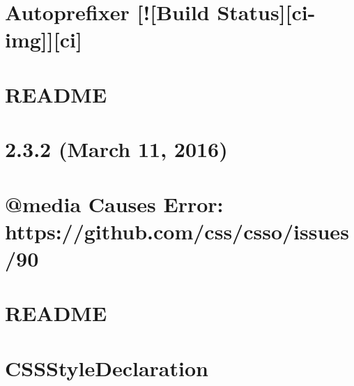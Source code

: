 \documentclass[twoside]{book}
\newcommand{\+}{\discretionary{\mbox{\scriptsize$\hookleftarrow$}}{}{}}
\begin{document}
\chapter{Autoprefixer \mbox{[}!\mbox{[}Build Status\mbox{]}\mbox{[}ci-\/img\mbox{]}\mbox{]}\mbox{[}ci\mbox{]}}
\label{md__c_1_workspace_demo_src_main_script_node_modules_cssnano_node_modules_autoprefixer__r_e_a_d_m_e}

\chapter{R\+E\+A\+D\+ME}
\label{md__c_1_workspace_demo_src_main_script_node_modules_cssnano__r_e_a_d_m_e}

\chapter{2.3.2 (March 11, 2016)}
\label{md__c_1_workspace_demo_src_main_script_node_modules_csso__h_i_s_t_o_r_y}

\chapter{@media Causes Error\+: https\+://github.com/css/csso/issues/90}
\label{inside}

\chapter{R\+E\+A\+D\+ME}
\label{md__c_1_workspace_demo_src_main_script_node_modules_csso__r_e_a_d_m_e}

\chapter{C\+S\+S\+Style\+Declaration}
\label{md__c_1_workspace_demo_src_main_script_node_modules_cssstyle__r_e_a_d_m_e}

\end{document}
